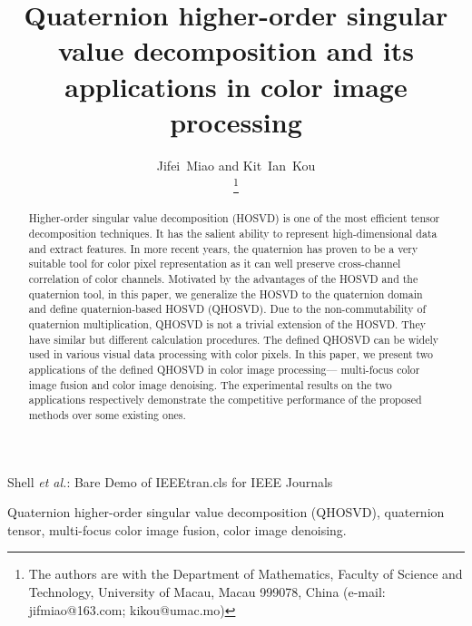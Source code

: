 \documentclass[journal]{IEEEtran}
\begin{document}
	
\title{Quaternion higher-order singular value decomposition and its applications in color image processing}
 

\author{Jifei~Miao and Kit~Ian~Kou


\thanks{The authors are with the Department of Mathematics, Faculty of Science
	and Technology, University of Macau, Macau 999078, China  (e-mail: jifmiao@163.com;
	kikou@umac.mo)}}%


%
{Shell \MakeLowercase{\textit{et al.}}: Bare Demo of IEEEtran.cls for IEEE Journals}

\maketitle

\begin{abstract}
Higher-order singular value decomposition (HOSVD) is one of the most efficient tensor decomposition techniques. It has the salient ability to represent high-dimensional data and extract features. In more recent years, the quaternion has proven to be a very suitable tool for color pixel representation as it can well preserve cross-channel correlation  of color channels. Motivated by the advantages of the HOSVD and the quaternion tool, in this paper, we generalize the HOSVD to the quaternion domain and define quaternion-based HOSVD (QHOSVD). Due to the non-commutability of quaternion multiplication, QHOSVD is not a trivial extension of the HOSVD. They have similar but different calculation procedures. The defined QHOSVD can be widely used in various visual data processing with color pixels. In this paper, we present two applications of the defined QHOSVD in color image processing--- multi-focus color image fusion and color image denoising. The experimental results on the two applications respectively demonstrate the competitive performance
of the proposed methods over some existing ones.
\end{abstract}
\begin{IEEEkeywords}
Quaternion higher-order singular value decomposition (QHOSVD), quaternion tensor, multi-focus color image fusion, color image denoising.
\end{IEEEkeywords}

\IEEEpeerreviewmaketitle
\end{document}
